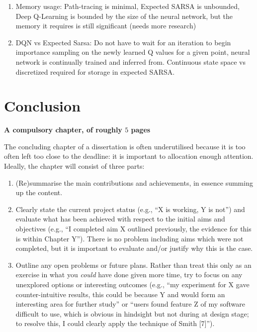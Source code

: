 \documentclass[ %
                    author={Callum Pearce},
                supervisor={Dr. Neill Campbell},
                    degree={MEng},
                     title={How effective are Temporal difference learning methods for reducing the number of zero contribution light paths while still accurately approximating Global Illumination in Path tracing?},
                  subtitle={},
                      type={research},
                      year={2019} ]{dissertation}
\begin{document}
\begin{enumerate}
\item Memory usage: Path-tracing is minimal, Expected SARSA is unbounded, Deep Q-Learning is bounded by the size of the neural network, but the memory it requires is still significant (needs more research)

\item DQN vs Expected Sarsa: Do not have to wait for an iteration to begin
 importance sampling on the newly learned Q values for a given point, 
 neural network is continually trained and inferred from. Continuous state 
 space vs discretized required for storage in expected SARSA.
\end{enumerate}


\chapter{Conclusion}
\label{chap:conclusion}

{\bf A compulsory chapter,     of roughly $5$ pages} 
\vspace{1cm} 

\noindent
The concluding chapter of a dissertation is often underutilised because it 
is too often left too close to the deadline: it is important to allocation
enough attention.  Ideally, the chapter will consist of three parts:

\begin{enumerate}
\item (Re)summarise the main contributions and achievements, in essence
      summing up the content.
\item Clearly state the current project status (e.g., ``X is working, Y 
      is not'') and evaluate what has been achieved with respect to the 
      initial aims and objectives (e.g., ``I completed aim X outlined 
      previously, the evidence for this is within Chapter Y'').  There 
      is no problem including aims which were not completed, but it is 
      important to evaluate and/or justify why this is the case.
\item Outline any open problems or future plans.  Rather than treat this
      only as an exercise in what you {\em could} have done given more 
      time, try to focus on any unexplored options or interesting outcomes
      (e.g., ``my experiment for X gave counter-intuitive results, this 
      could be because Y and would form an interesting area for further 
      study'' or ``users found feature Z of my software difficult to use,
      which is obvious in hindsight but not during at design stage; to 
      resolve this, I could clearly apply the technique of Smith [7]'').
\end{enumerate}
\end{document}
